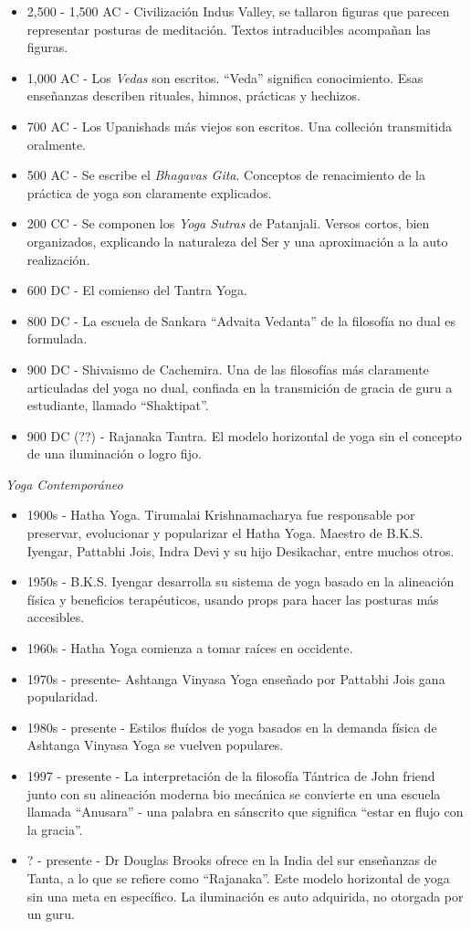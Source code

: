 \begin{itemize}
	\item 2,500 - 1,500 AC - Civilización Indus Valley, se tallaron figuras que parecen representar posturas de meditación. Textos intraducibles acompañan las figuras.
	\item 1,000 AC - Los \textit{Vedas} son escritos. ``Veda'' significa conocimiento. Esas enseñanzas describen rituales, himnos, prácticas y hechizos.
	\item 700 AC - Los Upanishads más viejos son escritos. Una colleción transmitida oralmente.
	\item 500 AC - Se escribe el \textit{Bhagavas Gita}. Conceptos de renacimiento de la práctica de yoga son claramente explicados.
	\item 200 CC - Se componen los \textit{Yoga Sutras} de Patanjali. Versos cortos, bien organizados, explicando la naturaleza del Ser y una aproximación a la auto realización.
	\item 600 DC - El comienso del Tantra Yoga.
	\item 800 DC - La escuela de Sankara ``Advaita Vedanta'' de la filosofía no dual es formulada.
	\item 900 DC - Shivaismo de Cachemira. Una de las filosofías más claramente articuladas del yoga no dual, confiada en la transmición de gracia de guru a estudiante, llamado ``Shaktipat''.
	\item 900 DC (??) - Rajanaka Tantra. El modelo horizontal de yoga sin el concepto de una iluminación o logro fijo.
\end{itemize}

\textit{Yoga Contemporáneo}
\begin{itemize}
	\item 1900s - Hatha Yoga. Tirumalai Krishnamacharya fue responsable por preservar, evolucionar y popularizar el Hatha Yoga. Maestro de B.K.S. Iyengar, Pattabhi Jois, Indra Devi y su hijo Desikachar, entre muchos otros.
	\item 1950s - B.K.S. Iyengar desarrolla su sistema de yoga basado en la alineación física y beneficios terap\'euticos, usando props para hacer las posturas más accesibles.
	\item 1960s - Hatha Yoga comienza a tomar raíces en occidente.
	\item 1970s - presente- Ashtanga Vinyasa Yoga enseñado por Pattabhi Jois gana popularidad.
	\item 1980s - presente - Estilos fluídos de yoga basados en la demanda física de Ashtanga Vinyasa Yoga se vuelven populares.
	\item 1997 - presente - La interpretación de la filosofía Tántrica de John friend junto con su alineación moderna bio mecánica se convierte en una escuela llamada ``Anusara'' - una palabra en sánscrito que significa ``estar en flujo con la gracia''.
	\item ? - presente - Dr Douglas Brooks ofrece en la India del sur enseñanzas de Tanta, a lo que se refiere como ``Rajanaka''. Este modelo horizontal de yoga sin una meta en específico. La iluminación es auto adquirida, no otorgada por un guru.
\end{itemize}

